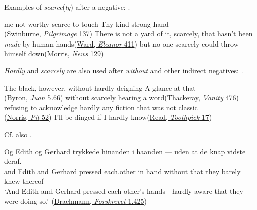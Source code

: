 Examples of \textit{scarce}(\textit{ly}) after a negative: .

\ea \label{ex:07-59}
\ea me not worthy scarce to touch Thy kind strong hand\\\hfill(\href{https://archive.org/details/tirstramlyoness00swingoog/page/n154/mode/2up?q=%22worthy+scarce%22&view=theater}{Swinburne, \textit{Pilgrimage} 137})
\ex There is not a yard of it, scarcely, that hasn't been \emph{made} by human hands\hfill(\href{https://archive.org/details/cu31924013567130/page/512/mode/2up?q=%22a+yard+of+it%22&view=theater}{Ward, \textit{Eleanor} 411}) %
\ex but no one scarcely could throw himself down\hfill(\href{https://archive.org/details/newsfromnowher00morr/page/154/mode/2up?q=%22but+no%22&view=theater}{Morris, \textit{News} 129})
\z
\z

\textit{Hardly} and \textit{scarcely} are also used after \textit{without} and other indirect negatives: . \label{sec:indirect}

\ea \label{ex:07-62}
\ea The black, however, without hardly deigning A glance at that\\\hfill(\href{https://archive.org/details/workslordbyron10unkngoog/page/236/mode/2up?view=theater&q=%22without+hardly+deigning%22}{Byron, \textit{Juan} 5.66})
\ex without scarcely hearing a word\hfill(\href{https://archive.org/details/vanityfairanove03thacgoog/page/n293/mode/2up?q=%22hearing+a+word%22&view=theater}{Thackeray, \textit{Vanity} 476})
\ex refusing to acknowledge hardly any fiction that was not classic\\\hfill(\href{https://archive.org/details/pitepicofwheatde00norruoft/page/44/mode/2up?view=theater&q=%22refusing+to+acknowledge%22}{Norris, \textit{Pit} 52})
\ex I'll be dinged if I hardly know\hfill(\href{https://archive.org/details/toothpicktales00readgoog/page/n22/mode/2up?q=dinged&view=theater}{Read, \textit{Toothpick} 17})
\z
\z

Cf. also .

\ea \label{ex:07-66}
\gll Og Edith og Gerhard trykkede hinanden i haanden --- uden at de knap vidste deraf.\\
and Edith and Gerhard pressed {each.other} in hand\DEF{} {} without that they barely knew thereof\\
\glt `And Edith and Gerhard pressed each other's hands---hardly aware that they were doing so.' \hfill (\href{https://tekster.kb.dk/text/adl-texts-drachmann14val-root#s297}{Drachmann, \textit{Forskrevet} 1.425})
\z

